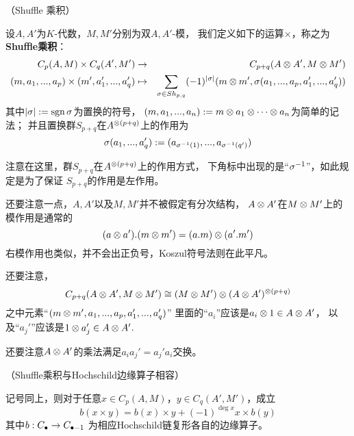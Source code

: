
\begin{definition}（Shuffle 乘积）

设$A,A'$为$K$-代数，$M,M'$分别为双$A,A'$-模，
我们定义如下的运算$\times$，称之为\textbf{Shuffle乘积}：
\begin{eqnarray*}
C_p(A,M)\times C_q(A',M')&\to& C_{p+q}(A\otimes A',M\otimes M')\\
(m,a_1,...,a_p)\times(m',a_1',...,a_q')&\mapsto&
\sum_{\sigma\in Sh_{p,q}}
  (-1)^{|\sigma|}
  (m\otimes m',\sigma(a_1,...,a_p,a_1',...,a_q'))
\end{eqnarray*}
其中$|\sigma|:=\operatorname{sgn}\sigma$为置换的符号，
$(m,a_1,...,a_n):=m\otimes a_1\otimes\cdots\otimes a_n$为简单的记法；
并且置换群$S_{p+q}$在$A^{\otimes (p+q)}$上的作用为
$$\sigma(a_1,...,a_q')
:=(a_{\sigma^{-1}(1)},...,a_{\sigma^{-1}(q')})$$
\end{definition}

注意在这里，群$S_{p+q}$在$A^{\otimes(p+q)}$上的作用方式，
下角标中出现的是“$\sigma^{-1}$”，如此规定是为了保证
$S_{p+q}$的作用是左作用。

还要注意一点，$A,A'$以及$M,M'$并不被假定有分次结构，
$A\otimes A'$在$M\otimes M'$上的模作用是通常的
$$(a\otimes a').(m\otimes m')=(a.m)\otimes(a'.m')$$
右模作用也类似，并不会出正负号，Koszul符号法则在此平凡。

还要注意，
$$C_{p+q}(A\otimes A',M\otimes M')
\cong (M\otimes M')\otimes (A\otimes A')^{\otimes(p+q)}$$
之中元素“$(m\otimes m',a_1,...,a_p,a_1',...,a_q')$”
里面的“$a_i$”应该是$a_i\otimes 1\in A\otimes A'$，
以及“$a_j'$”应该是$1\otimes a_j'\in A\otimes A'$.

还要注意$A\otimes A'$的乘法满足$a_ia_j'=a_j'a_i$交换。

\begin{prop}（Shuffle乘积与Hochschild边缘算子相容）

记号同上，则对于任意$x\in C_p(A,M)$，$y\in C_q(A',M')$，成立
$$b(x\times y)=
b(x)\times y+(-1)^{\deg x}
x\times b(y)$$
其中$b:C_{\bullet}\to C_{\bullet-1}$
为相应Hochschild链复形各自的边缘算子。
\end{prop}

